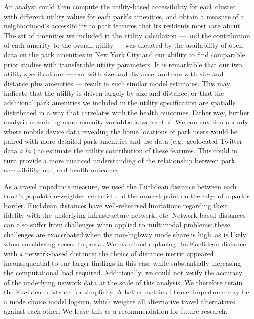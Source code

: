 \documentclass[shortAfour,sageh.bst]{sagej}
\begin{document}
An analyst could then compute the utility-based accessibility for each
cluster with different utility values for each park's amenities, and
obtain a measure of a neighborhood's accessibility to park features that
its residents most care about. The set of amenities we included in the
utility calculation --- and the contribution of each amenity to the
overall utility --- was dictated by the availability of open data on the
park amenities in New York City and our ability to find comparable prior
studies with transferable utility parameters. It is remarkable that our
two utility specifications --- one with size and distance, and one with
size and distance plus amenities --- result in such similar model
estimates. This may indicate that the utility is driven largely by size
and distance, or that the additional park amenities we included in the
utility specification are spatially distributed in a way that correlates
with the health outcomes. Either way, further analysis examining more
amenity variables is warranted. We can envision a study where mobile
device data revealing the home locations of park users would be paired
with more detailed park amenities and use data (e.g.~geolocated Twitter
data \emph{a la} \citet{roberts2017using}) to estimate the utility
contribution of these features. This could in turn provide a more
nuanced understanding of the relationship between park accessibility,
use, and health outcomes.

As a travel impedance measure, we used the Euclidean distance between
each tract's population-weighted centroid and the nearest point on the
edge of a park's border. Euclidean distances have well-rehearsed
limitations regarding their fidelity with the underlying infrastructure
network, etc. Network-based distances can also suffer from challenges
when applied to multimodal problems; these challenges are exacerbated
when the non-highway mode share is high, as is likely when considering
access to parks. We examined replacing the Euclidean distance with a
network-based distance; the choice of distance metric appeared
inconsequential to our larger findings in this case while substantially
increasing the computational load required. Additionally, we could not
verify the accuracy of the underlying network data at the scale of this
analysis. We therefore retain the Euclidean distance for simplicity. A
better metric of travel impedance may be a mode choice model logsum,
which weights all alternative travel alternatives against each other. We
leave this as a recommendation for future research.
\end{document}
